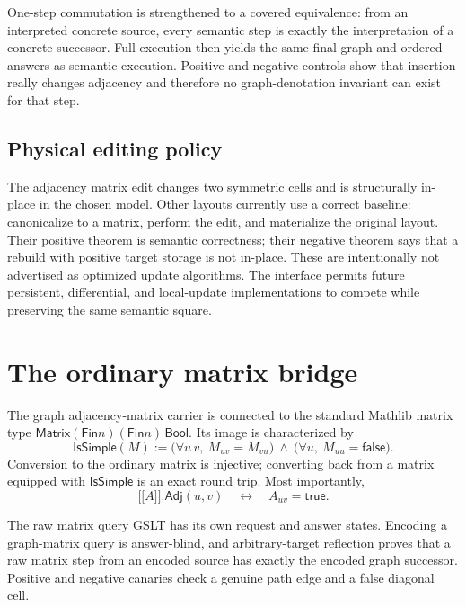 \documentclass[11pt]{article}
\theoremstyle{remark}
\newcommand{\denote}[1]{\mathopen{[\![}#1\mathclose{]\!]}}
\newcommand{\Fin}{\mathsf{Fin}}
\begin{document}
One-step commutation is strengthened to a covered equivalence: from an
interpreted concrete source, every semantic step is exactly the interpretation
of a concrete successor.  Full execution then yields the same final graph and
ordered answers as semantic execution.  Positive and negative controls show
that insertion really changes adjacency and therefore no graph-denotation
invariant can exist for that step.

\subsection{Physical editing policy}

The adjacency matrix edit changes two symmetric cells and is structurally
in-place in the chosen model.  Other layouts currently use a correct baseline:
canonicalize to a matrix, perform the edit, and materialize the original
layout.  Their positive theorem is semantic correctness; their negative
theorem says that a rebuild with positive target storage is not in-place.
These are intentionally not advertised as optimized update algorithms.  The
interface permits future persistent, differential, and local-update
implementations to compete while preserving the same semantic square.

\section{The ordinary matrix bridge}
\label{sec:matrix}

The graph adjacency-matrix carrier is connected to the standard Mathlib matrix
type \(\mathsf{Matrix}(\Fin n)(\Fin n)\,\mathsf{Bool}\).  Its image is
characterized by
\[
\mathsf{IsSimple}(M) :=
  \bigl(\forall u\,v,\ M_{uv}=M_{vu}\bigr)\ \wedge\
  \bigl(\forall u,\ M_{uu}=\mathsf{false}\bigr).
\]
Conversion to the ordinary matrix is injective; converting back from a matrix
equipped with \(\mathsf{IsSimple}\) is an exact round trip.  Most importantly,
\[
  \denote{A}.\mathsf{Adj}(u,v)
  \quad\longleftrightarrow\quad A_{uv}=\mathsf{true}.
\]

The raw matrix query GSLT has its own request and answer states.  Encoding a
graph-matrix query is answer-blind, and arbitrary-target reflection proves
that a raw matrix step from an encoded source has exactly the encoded graph
successor.  Positive and negative canaries check a genuine path edge and a
false diagonal cell.
\end{document}
